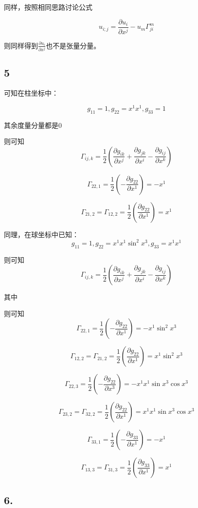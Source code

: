\documentclass[UTF8,zihao=5]{ctexart}
\newcommand*{\pd}[2]{\frac{\partial #1}{\partial #2}}
\begin{document}
同样，按照相同思路讨论公式

$$
u_{i;j}=\pd{u_i}{x^j}-u_{m}\Gamma^m_{ji}
$$

则同样得到$\pd{u_i}{x^j}$也不是张量分量。

\subsection*{5}

可知在柱坐标中：

$$
g_{11}=1, g_{22}=x^{1}x^{1}, g_{33}=1
$$

其余度量分量都是0

则可知
$$
\Gamma_{ij,k}=\frac{1}{2}\left(
\pd{g_{ik}}{x^j}+\pd{g_{jk}}{x^i}
-\pd{g_{ij}}{x^k}
\right)
$$


$$
\Gamma_{22,1}=\frac{1}{2}\left(
    -\pd{g_{22}}{x^1}
    \right)=-x^{1}
$$

$$
\Gamma_{21,2}=\Gamma_{12,2}=\frac{1}{2}\left(
\pd{g_{22}}{x^1}
\right)=x^{1}
$$

同理，在球坐标中已知：
$$
g_{11}=1, 
g_{22}=x^{1}x^{1}\sin^2{x^{3}}, 
g_{33}=x^{1}x^{1}
$$

则可知
$$
\Gamma_{ij,k}=\frac{1}{2}\left(
\pd{g_{ik}}{x^j}+\pd{g_{jk}}{x^i}
-\pd{g_{ij}}{x^k}
\right)
$$

其中

则可知
$$
\Gamma_{22,1}=\frac{1}{2}\left(
-\pd{g_{22}}{x^1}
\right)=-x^{1}\sin^2{x^{3}}
$$

$$
\Gamma_{12,2}=\Gamma_{21,2}=\frac{1}{2}\left(
    \pd{g_{22}}{x^1}
    \right)=x^{1}\sin^2{x^{3}}
$$

$$
\Gamma_{22,3}=\frac{1}{2}\left(
-\pd{g_{22}}{x^3}
\right)=-x^{1}x^{1}\sin{x^{3}}\cos{x^{3}}
$$

$$
\Gamma_{23,2}=\Gamma_{32,2}=\frac{1}{2}\left(
    \pd{g_{22}}{x^1}
    \right)=x^{1}x^{1}\sin{x^{3}}\cos{x^{3}}
$$

$$
\Gamma_{33,1}=\frac{1}{2}\left(
-\pd{g_{33}}{x^1}
\right)=-x^{1}
$$

$$
\Gamma_{13,3}=\Gamma_{31,3}=\frac{1}{2}\left(
    \pd{g_{33}}{x^1}
    \right)=x^{1}
$$

\subsection*{6.}
\end{document}
